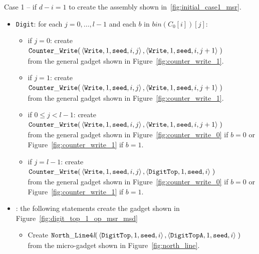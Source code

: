 Case 1 -- if $d - i = 1$ to create the assembly shown in~\ref{fig:initial_case1_msr}.
\begin{itemize}
    \item {\tt Digit}: for each $j=0,\ldots,l-1$ and each $b$ in $bin(C_0[i])[j]$:
    \begin{itemize}
        \item if $j = 0$: create
        $\begin{aligned}[t]
            {\tt Counter\_Write}(&\left\langle {\tt Write}, 1, {\tt seed}, i, j \right\rangle, \left\langle {\tt Write}, 1, {\tt seed}, i, j + 1 \right\rangle \;)
        \end{aligned}$\\from the general gadget shown in Figure~\ref{fig:counter_write_1}.

        \item if $j = 1$: create
        $\begin{aligned}[t]
            {\tt Counter\_Write}(&\left\langle {\tt Write}, 1, {\tt seed}, i, j \right\rangle, \left\langle {\tt Write}, 1, {\tt seed}, i, j + 1 \right\rangle \;)
        \end{aligned}$\\from the general gadget shown in Figure~\ref{fig:counter_write_1}.

        \item if $0 \leqslant j < l - 1$: create
        $\begin{aligned}[t]
            {\tt Counter\_Write}(&\left\langle {\tt Write}, 1, {\tt seed}, i, j \right\rangle, \left\langle {\tt Write}, 1, {\tt seed}, i, j + 1 \right\rangle \;)
        \end{aligned}$\\from the general gadget shown in Figure~\ref{fig:counter_write_0} if $b = 0$ or Figure~\ref{fig:counter_write_1} if $b = 1$.

        \item if $j = l-1$: create
        $\begin{aligned}[t]
            {\tt Counter\_Write}(&\left\langle {\tt Write}, 1, {\tt seed}, i, j \right\rangle, \left\langle {\tt DigitTop}, 1, {\tt seed}, i \right\rangle \;)
        \end{aligned}$\\from the general gadget shown in Figure~\ref{fig:counter_write_0} if $b = 0$ or Figure~\ref{fig:counter_write_1} if $b = 1$.
    \end{itemize}

    \item {\dtop}: the following statements create the gadget shown in Figure~\ref{fig:digit_top_1_op_msr_msd}
    \begin{itemize}
        \item Create
        $\begin{aligned}[t]
            {\tt North\_Line4\textit{l}}(& \left\langle {\tt DigitTop},  1, {\tt seed}, i \right\rangle,
                                           \left\langle {\tt DigitTopA}, 1, {\tt seed}, i \right\rangle \;)
        \end{aligned}$\\from the micro-gadget shown in Figure~\ref{fig:north_line}.


\end{itemize}
\end{itemize}
